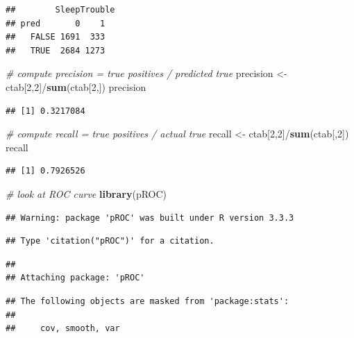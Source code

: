 \documentclass[]{article}
\newenvironment{Shaded}{\begin{snugshade}}{\end{snugshade}}
\newcommand{\KeywordTok}[1]{\textcolor[rgb]{0.13,0.29,0.53}{\textbf{{#1}}}}
\newcommand{\DecValTok}[1]{\textcolor[rgb]{0.00,0.00,0.81}{{#1}}}
\newcommand{\StringTok}[1]{\textcolor[rgb]{0.31,0.60,0.02}{{#1}}}
\newcommand{\CommentTok}[1]{\textcolor[rgb]{0.56,0.35,0.01}{\textit{{#1}}}}
\newcommand{\NormalTok}[1]{{#1}}
\begin{document}
\begin{verbatim}
##        SleepTrouble
## pred       0    1
##   FALSE 1691  333
##   TRUE  2684 1273
\end{verbatim}

\begin{Shaded}
\begin{Highlighting}[]
\CommentTok{# compute precision = true positives / predicted true}
\NormalTok{precision <-}\StringTok{ }\NormalTok{ctab[}\DecValTok{2}\NormalTok{,}\DecValTok{2}\NormalTok{]/}\KeywordTok{sum}\NormalTok{(ctab[}\DecValTok{2}\NormalTok{,])}
\NormalTok{precision}
\end{Highlighting}
\end{Shaded}

\begin{verbatim}
## [1] 0.3217084
\end{verbatim}

\begin{Shaded}
\begin{Highlighting}[]
\CommentTok{# compute recall = true positives / actual true}
\NormalTok{recall <-}\StringTok{ }\NormalTok{ctab[}\DecValTok{2}\NormalTok{,}\DecValTok{2}\NormalTok{]/}\KeywordTok{sum}\NormalTok{(ctab[,}\DecValTok{2}\NormalTok{])}
\NormalTok{recall}
\end{Highlighting}
\end{Shaded}

\begin{verbatim}
## [1] 0.7926526
\end{verbatim}

\begin{Shaded}
\begin{Highlighting}[]
\CommentTok{# look at ROC curve}
\KeywordTok{library}\NormalTok{(pROC)}
\end{Highlighting}
\end{Shaded}

\begin{verbatim}
## Warning: package 'pROC' was built under R version 3.3.3
\end{verbatim}

\begin{verbatim}
## Type 'citation("pROC")' for a citation.
\end{verbatim}

\begin{verbatim}
## 
## Attaching package: 'pROC'
\end{verbatim}

\begin{verbatim}
## The following objects are masked from 'package:stats':
## 
##     cov, smooth, var
\end{verbatim}
\end{document}
